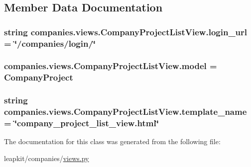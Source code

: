 \subsection{Member Data Documentation}
\hypertarget{classcompanies_1_1views_1_1_company_project_list_view_a4b48a72c216bade4e3c45c81b1e7d578}{
\subsubsection[{login\-\_\-url}]{\setlength{\rightskip}{0pt plus 5cm}string companies.\-views.\-Company\-Project\-List\-View.\-login\-\_\-url = \char`\"{}/companies/login/\char`\"{}\hspace{0.3cm}{\ttfamily [static]}}}\label{classcompanies_1_1views_1_1_company_project_list_view_a4b48a72c216bade4e3c45c81b1e7d578}
\hypertarget{classcompanies_1_1views_1_1_company_project_list_view_a01f8b6cc0240cc87276ac9e2b3b126e1}{
\subsubsection[{model}]{\setlength{\rightskip}{0pt plus 5cm}companies.\-views.\-Company\-Project\-List\-View.\-model = Company\-Project\hspace{0.3cm}{\ttfamily [static]}}}\label{classcompanies_1_1views_1_1_company_project_list_view_a01f8b6cc0240cc87276ac9e2b3b126e1}
\hypertarget{classcompanies_1_1views_1_1_company_project_list_view_a8b8cdbbe6c489f5fa3fa70283413eaf3}{
\subsubsection[{template\-\_\-name}]{\setlength{\rightskip}{0pt plus 5cm}string companies.\-views.\-Company\-Project\-List\-View.\-template\-\_\-name = \char`\"{}company\-\_\-project\-\_\-list\-\_\-view.\-html\char`\"{}\hspace{0.3cm}{\ttfamily [static]}}}\label{classcompanies_1_1views_1_1_company_project_list_view_a8b8cdbbe6c489f5fa3fa70283413eaf3}


The documentation for this class was generated from the following file\-:\begin{DoxyCompactItemize}
\item 
leapkit/companies/\hyperlink{companies_2views_8py}{views.\-py}\end{DoxyCompactItemize}
